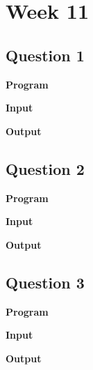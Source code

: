 \documentclass{article}
\begin{document}
\section{Week 11}

\subsection{Question 1}

\newline 

\noindent \textbf{\large{Program}}

\newpage
\noindent \textbf{\large{Input}}

\noindent \textbf{\large{Output}}


\newpage
\subsection{Question 2}

\newline 

\noindent \textbf{\large{Program}}

\newpage
\noindent \textbf{\large{Input}}

\noindent \textbf{\large{Output}}


\newpage
\subsection{Question 3}

\newline 

\noindent \textbf{\large{Program}}

\newpage
\noindent \textbf{\large{Input}}

\noindent \textbf{\large{Output}}

\end{document}
